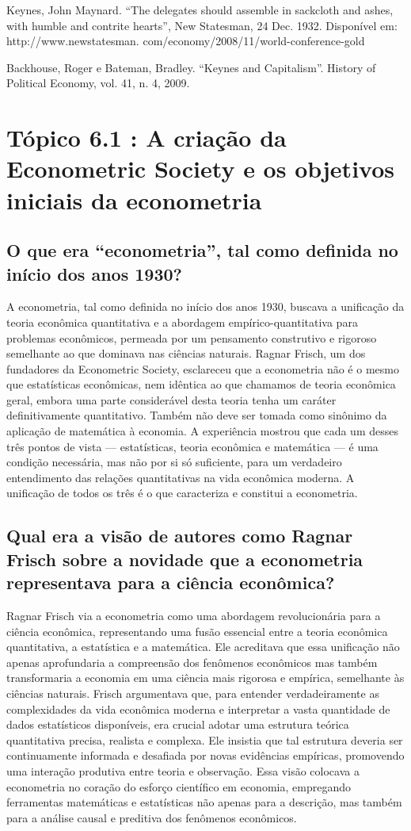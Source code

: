 \documentclass[12pt]{article}
\begin{document}
Keynes, John Maynard. “The delegates should assemble in sackcloth and ashes, with humble
and contrite hearts”, New Statesman, 24 Dec. 1932. Disponível em: http://www.newstatesman.
com/economy/2008/11/world-conference-gold

Backhouse, Roger e Bateman, Bradley. “Keynes and Capitalism”. History of Political Economy,
vol. 41, n. 4, 2009.

\section{\textbf{Tópico 6.1 : A criação da Econometric Society e os objetivos iniciais da econometria}}
\subsection{\textbf{O que era “econometria”, tal como definida no início dos anos 1930?}}
A econometria, tal como definida no início dos anos 1930, buscava a unificação da teoria econômica quantitativa e a abordagem empírico-quantitativa para problemas econômicos, permeada por um pensamento construtivo e rigoroso semelhante ao que dominava nas ciências naturais. Ragnar Frisch, um dos fundadores da Econometric Society, esclareceu que a econometria não é o mesmo que estatísticas econômicas, nem idêntica ao que chamamos de teoria econômica geral, embora uma parte considerável desta teoria tenha um caráter definitivamente quantitativo. Também não deve ser tomada como sinônimo da aplicação de matemática à economia. A experiência mostrou que cada um desses três pontos de vista — estatísticas, teoria econômica e matemática — é uma condição necessária, mas não por si só suficiente, para um verdadeiro entendimento das relações quantitativas na vida econômica moderna. A unificação de todos os três é o que caracteriza e constitui a econometria.

\subsection{\textbf{Qual era a visão de autores como Ragnar Frisch sobre a novidade que a econometria representava para a ciência econômica?}}
Ragnar Frisch via a econometria como uma abordagem revolucionária para a ciência econômica, representando uma fusão essencial entre a teoria econômica quantitativa, a estatística e a matemática. Ele acreditava que essa unificação não apenas aprofundaria a compreensão dos fenômenos econômicos mas também transformaria a economia em uma ciência mais rigorosa e empírica, semelhante às ciências naturais. Frisch argumentava que, para entender verdadeiramente as complexidades da vida econômica moderna e interpretar a vasta quantidade de dados estatísticos disponíveis, era crucial adotar uma estrutura teórica quantitativa precisa, realista e complexa. Ele insistia que tal estrutura deveria ser continuamente informada e desafiada por novas evidências empíricas, promovendo uma interação produtiva entre teoria e observação. Essa visão colocava a econometria no coração do esforço científico em economia, empregando ferramentas matemáticas e estatísticas não apenas para a descrição, mas também para a análise causal e preditiva dos fenômenos econômicos.
\end{document}

